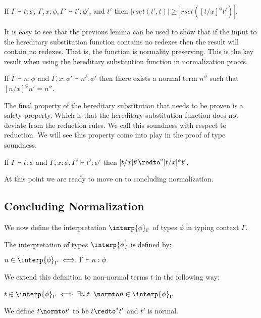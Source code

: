 \begin{lemma}
  \label{lemma:redex_preserving_ssfp}
  \small
  If $\Gamma \vdash t : \phi$, $\Gamma, x:\phi, \Gamma' \vdash t':\phi'$, and
  $t'$ then $|rset(t', t)| \geq |rset([t/x]^\phi t')|$.
\end{lemma}
It is easy to see that the previous lemma can be used to show that if
the input to the hereditary substitution function contains no redexes
then the result will contain no redexes.  That is, the function is
normality preserving.  This is the key result when using the
hereditary substitution function in normalization proofs.
\begin{lemma}
  \label{corollary:normalization_preserving_ssfp}
  If $\Gamma \vdash n:\phi$ and $\Gamma, x:\phi' \vdash n':\phi'$ then there exists 
  a normal term $n''$ such that $[n/x]^\phi n' = n''$.
\end{lemma}
The final property of the hereditary substitution that needs to be
proven is a safety property.  Which is that the hereditary substitution
function does not deviate from the reduction rules.  We call
this soundness with respect to reduction.  We will see this property
come into play in the proof of type soundness.
\begin{lemma}
  \label{lemma:soundness_reduction_ssfp}
  If $\Gamma \vdash t : \phi$ and $\Gamma, x:\phi, \Gamma' \vdash t':\phi'$ then
  $[t/x]t' \redto^* [t/x]^\phi t'$.
\end{lemma}
At this point we are ready to move on to concluding normalization.

\subsection{Concluding Normalization}
\label{subsec:concluding_normalization_ssfp}
We now define the interpretation $\interp{\phi}_\Gamma$ of types $\phi$ in typing context 
$\Gamma$.  
\begin{definition}
  \label{def:interpretation_types_ssfp}
  The interpretation of types $\interp{\phi}$ is defined by:
  \begin{center}
    $n \in \interp{\phi}_\Gamma \iff \Gamma \vdash n:\phi$
  \end{center}
  We extend this definition to non-normal terms $t$ in the following way:
  \begin{center}
    $t \in \interp{\phi}_\Gamma \iff \exists n.t$ $\normto n \in \interp{\phi}_\Gamma$
  \end{center}
\end{definition}
We define $t \normto t'$ to be $t \redto^{*} t'$ and $t'$ is normal.

